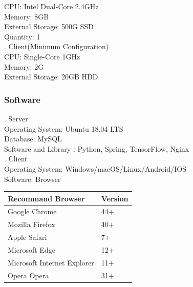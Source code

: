 \documentclass[16pt]{scrreprt}
\begin{document}
CPU: Intel Dual-Core 2.4GHz\\

Memory: 8GB\\

External Storage: 500G SSD\\

Quantity: 1\\

. Client(Minimum Configuration)\\

CPU: Single-Core 1GHz\\

Memory: 2G\\

External Storage: 20GB HDD\\


\subsubsection{Software}


. Server\\

Operating System: Ubuntu 18.04 LTS\\

Database: MySQL\\

Software and Library : Python, Spring, TensorFlow, Nginx\\


. Client\\

Operating System: Windows/macOS/Linux/Android/IOS\\

Software: Browser\\


\begin{center}
    \begin{tabular}{p{7cm}p{7cm}}
        \hline
	    Recommand Browser & Version\\
        \hline
	    Google Chrome &  44+\\
        \hline
	    Mozilla Firefox & 40+\\
        \hline
        Apple Safari & 7+\\
        \hline
        Microsoft Edge & 12+\\
        \hline
        Microsoft Internet Explorer & 11+\\
        \hline
        Opera Opera & 31+\\
        \hline

    \end{tabular}
\end{center}
\end{document}
